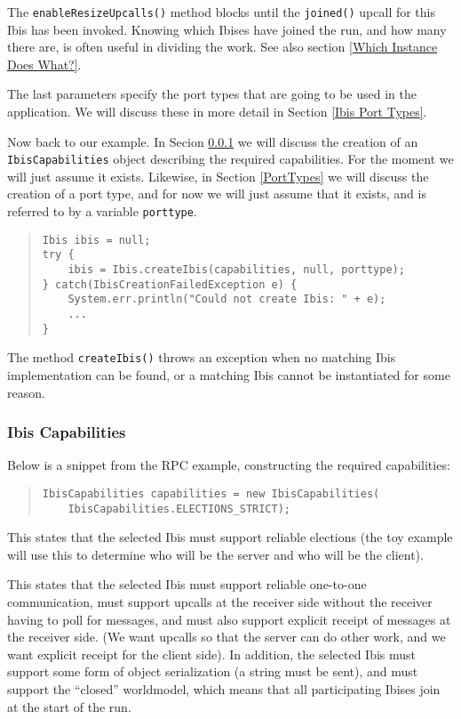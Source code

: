 \documentclass[10pt]{article}
\newcommand{\mysubsubsection}[1]{\subsubsection{#1}\label{#1}}
\begin{document}
The \texttt{enableResizeUpcalls()} method blocks until the
\texttt{joined()} upcall for this Ibis has been invoked.  Knowing which Ibises
have joined the run, and how many there are, is often useful in dividing
the work. See also section \ref{Which Instance Does What?}.

The last parameters specify the port types that are going to be used
in the application. We will discuss these in more detail in Section
\ref{Ibis Port Types}.

Now back to our example. In Secion \ref{Ibis Capabilities} we will
discuss the creation of an \texttt{IbisCapabilities} object describing the
required capabilities. For the moment we will just assume it
exists. Likewise, in Section \ref{PortTypes} we will discuss the
creation of a port type, and for now we will just assume that it exists,
and is referred to by a variable \texttt{porttype}.
{\small
\begin{quote}
\begin{verbatim}
Ibis ibis = null;
try {
    ibis = Ibis.createIbis(capabilities, null, porttype);
} catch(IbisCreationFailedException e) {
    System.err.println("Could not create Ibis: " + e);
    ...
}
\end{verbatim}
\end{quote}
}
The method \texttt{createIbis()} throws an exception when no
matching Ibis implementation can be found, or a matching Ibis
cannot be instantiated for some reason.

\mysubsubsection{Ibis Capabilities}

Below is a snippet from the RPC example, constructing the required capabilities:
{\small
\begin{quote}
\begin{verbatim}
IbisCapabilities capabilities = new IbisCapabilities(
    IbisCapabilities.ELECTIONS_STRICT);
\end{verbatim}
\end{quote}
}

This states that the selected Ibis must support reliable elections
(the toy example will use this to determine who will be the server and
who will be the client).

This states that the selected Ibis must support reliable one-to-one
communication, must support upcalls at the receiver side without the
receiver having to poll for messages, and must also support explicit
receipt of messages at the receiver side.
(We want upcalls so that the server can do other work, and we want
explicit receipt for the client side).
In addition, the selected Ibis must support some form of object
serialization (a string must be sent),
and must support the ``closed'' worldmodel, which means
that all participating Ibises join at the start of the run.
\end{document}
